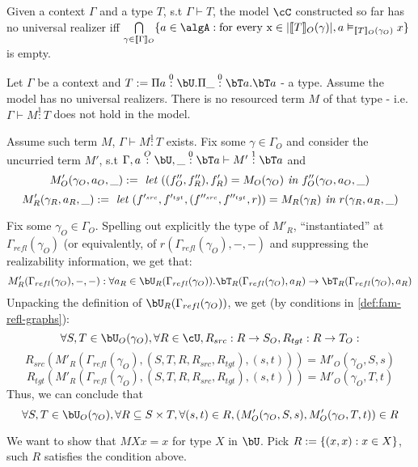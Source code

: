 \documentclass[12pt,a4paper]{article}
\def\src{_{src}}\alwaysmath{src}
\def\rfl{_{refl}}\alwaysmath{rfl}
\def\tgt{_{tgt}}\alwaysmath{tgt}
\renewcommand{\O}{_{O}}
\newcommand{\R}{\ensuremath{_{R}}}
\begin{document}
\begin{definition}
  Given a context $\Gamma$ and a type $T$, s.t $\Gamma \vdash  T$, the model $\cC$ constructed so far has no universal realizer iff $\bigcap\limits_{\gamma \in \llbracket\Gamma\rrbracket\O} \{ a \in \algA :  \text{for every x} \in \carr{\llbracket T\rrbracket \O(\gamma)}, a \vDash_{\llbracket T \rrbracket \O(\gamma\O)} x\}$ is empty.
\end{definition}

\begin{thm}
  Let $\Gamma$ be a context and $T \define \Pi a \overset{0}{:} \bU . \Pi \_ \overset{0}{:} \bT a . \bT a$  - a type. Assume the model has no universal realizers. There is no resourced term $M$ of that type - i.e. $\Gamma \vdash M \overset{1}{:} T$ does not hold in the model.
\end{thm}

Assume such term $M$, $\Gamma \vdash M \overset{1}{:} T$ exists. Fix some $\gamma \in \Gamma\O$ and consider the uncurried term $M'$, s.t $\Gamma, a \overset{O}{:} \bU, \_ \overset{0}: \bT a \vdash M' \overset{1}{:} \bT a$ and
$$ M'\O(\gamma\O, a\O, \_) \define \textit{ let } ((f''\O, f''\R) , f'\R)= M\O(\gamma\O) \textit{ in } f''\O(\gamma\O, a\O, \_)$$
$$ M'\R(\gamma\R, a\R, \_) \define \textit{ let } (f'^{\src}, f'^{\tgt}, (f''^{\src}, f''^{\tgt}, r)) = M\R(\gamma\R) \textit{ in } r(\gamma\R, a\R, \_)$$

Fix some $\gamma\O \in \Gamma\O$. Spelling out explicitly the type of $M'\R$, ``instantiated'' at $\Gamma\rfl(\gamma\O)$ (or equivalently, of $r(\Gamma\rfl(\gamma\O), - , -)$ and suppressing the realizability information, we get that:
$$M'\R(\Gamma\rfl(\gamma\O), -, -) : \forall a\R \in \bU\R(\Gamma\rfl(\gamma\O)). \bT\R(\Gamma\rfl(\gamma\O), a\R) \to \bT\R(\Gamma\rfl(\gamma\O), a\R)$$
Unpacking the definition of $\bU\R(\Gamma\rfl(\gamma\O))$, we get (by conditions in \cref{def:fam-refl-graphs}):
$$\forall S, T \in \bU\O(\gamma\O), \forall R \in \cU , R\src : R \to S\O, R\tgt : R \to T\O:$$
$$R\src(M'\R(\Gamma\rfl(\gamma\O),(S,T,R, R\src, R\tgt), (s,t))) = M'\O(\gamma\O, S, s)$$
$$R\tgt(M'\R(\Gamma\rfl(\gamma\O),(S,T,R, R\src, R\tgt), (s,t))) = M'\O(\gamma\O, T, t)$$
Thus, we can conclude that 
$$\forall S, T \in \bU\O(\gamma\O), \forall R \subseteq S \times T,  \forall (s,t) \in R, (M'\O(\gamma\O, S, s), M'\O(\gamma\O, T, t)) \in R$$

We want to show that $M X x = x$ for type $X$ in $\bU$.  Pick $R := \{(x, x) : x \in X \}$, such $R$ satisfies the condition above.
%
\printbibliography
\end{document}
